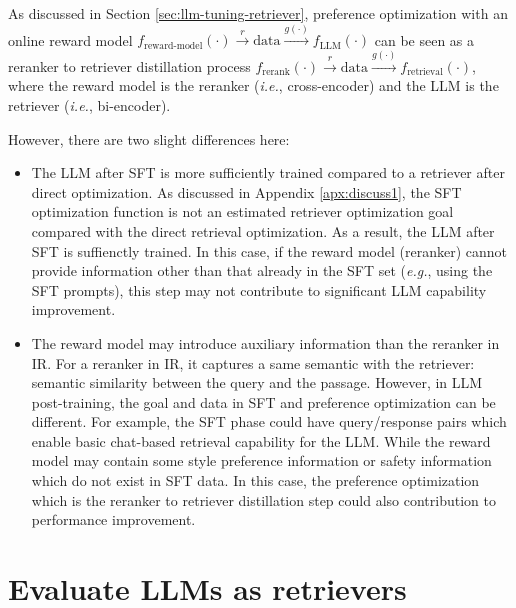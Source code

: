 As discussed in Section \ref{sec:llm-tuning-retriever}, preference optimization with an online reward model $f_{\text{reward-model}}(\cdot) \overset{r}{\rightarrow} \text{data} \overset{g(\cdot)}{\rightarrow}  f_{\text{LLM}}(\cdot)$ can be seen as a reranker to retriever distillation process $f_{\text{rerank}}(\cdot) \overset{r}{\rightarrow} \text{data}\overset{g(\cdot)}{\rightarrow}   f_{\text{retrieval}}(\cdot)$, where the reward model is the reranker (\textit{i.e.}, cross-encoder) and the LLM is the retriever (\textit{i.e.}, bi-encoder).

However, there are two slight differences here:
\begin{itemize}[leftmargin=*]
\item The LLM after SFT is more sufficiently trained compared to a retriever after direct optimization. As discussed in Appendix \ref{apx:discuss1}, the SFT optimization function is not an estimated retriever optimization goal compared with the direct retrieval optimization. As a result, the LLM after SFT is suffienctly trained. In this case, if the reward model (reranker) cannot provide information other than that already in the SFT set (\textit{e.g.}, using the SFT prompts), this step may not contribute to significant LLM capability improvement.
\item The reward model may introduce auxiliary information than the reranker in IR. For a reranker in IR, it captures a same semantic with the retriever: semantic similarity between the query and the passage. However, in LLM post-training, the goal and data in SFT and preference optimization can be different. For example, the SFT phase could have query/response pairs which enable basic chat-based retrieval capability for the LLM. While the reward model may contain some style preference information or safety information which do not exist in SFT data. In this case, the preference optimization which is the reranker to retriever distillation step could also contribution to performance improvement.
\end{itemize}


\section{Evaluate LLMs as retrievers}\label{apx:llm-as-retriever}

